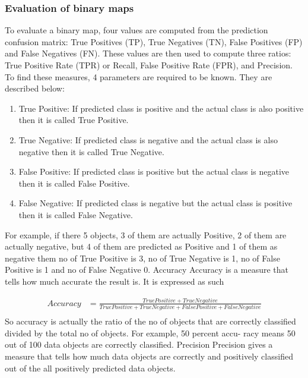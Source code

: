 \subsubsection{Evaluation of binary maps}

To evaluate a binary map,
four values are computed from the prediction confusion matrix: True Positives (TP), True Negatives (TN), False Positives (FP) and False Negatives (FN). These values are then
used to compute three ratios: True Positive Rate (TPR) or
Recall, False Positive Rate (FPR), and Precision.
To find these measures, 4 parameters are required to be known. They are described below:

\begin{enumerate}

\item True Positive: If predicted class is positive and the actual class is also positive then it is called True Positive.
\item True Negative: If predicted class is negative and the actual class is also negative then it is called True Negative.
\item False Positive: If predicted class is positive but the actual class is negative then it is called False Positive.
\item False Negative: If predicted class is negative but the actual class is positive then it is called False Negative.
\end{enumerate}
For example, if there 5 objects, 3 of them are actually Positive, 2 of them are actually negative, but 4 of them are predicted as Positive and 1 of them as negative them no of True Positive is 3, no of True Negative is 1, no of False Positive is 1 and no of False Negative 0.
Accuracy Accuracy is a measure that tells how much accurate the result is. It is expressed as such

\begin{align*}
 Accuracy&= \frac{TruePositive + TrueNegative}{TruePositive + TrueNegative + FalsePositive + FalseNegative}\\
 \end{align*}
\noindent
So accuracy is actually the ratio of the no of objects that are correctly classified divided by the total no of objects. For example, 50 percent accu- racy means 50 out of 100 data objects are correctly classified.
Precision Precision gives a measure that tells how much data objects are correctly and positively classified out of the all positively predicted data objects.

